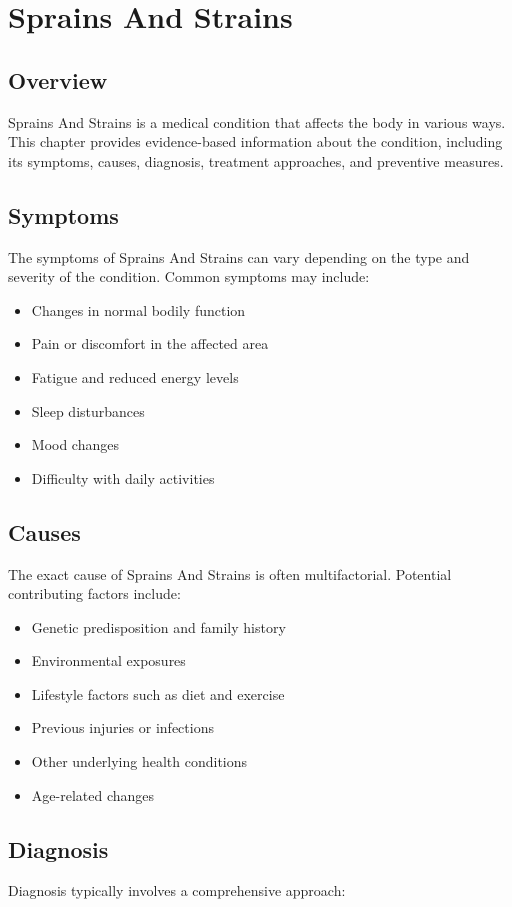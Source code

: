 \chapter{Sprains And Strains}

\section*{Overview}
Sprains And Strains is a medical condition that affects the body in various ways. This chapter provides evidence-based information about the condition, including its symptoms, causes, diagnosis, treatment approaches, and preventive measures.

\section*{Symptoms}
The symptoms of Sprains And Strains can vary depending on the type and severity of the condition. Common symptoms may include:

\begin{itemize}
\item Changes in normal bodily function
\item Pain or discomfort in the affected area
\item Fatigue and reduced energy levels
\item Sleep disturbances
\item Mood changes
\item Difficulty with daily activities
\end{itemize}

\section*{Causes}
The exact cause of Sprains And Strains is often multifactorial. Potential contributing factors include:

\begin{itemize}
\item Genetic predisposition and family history
\item Environmental exposures
\item Lifestyle factors such as diet and exercise
\item Previous injuries or infections
\item Other underlying health conditions
\item Age-related changes
\end{itemize}

\section*{Diagnosis}
Diagnosis typically involves a comprehensive approach:

